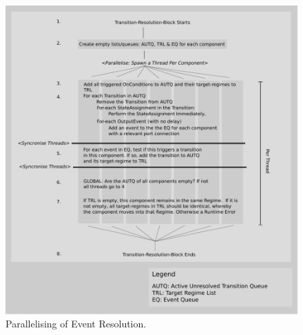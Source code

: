 \documentclass{article}
\begin{document}
\begin{figure}[htb!]
\center
\includegraphics[width=14cm]{images/ParallelisingTransitions.pdf}
\protect\caption{Parallelising of Event Resolution.}
\label{ParallelisingTransitions}
\end{figure}

%
\end{document}

